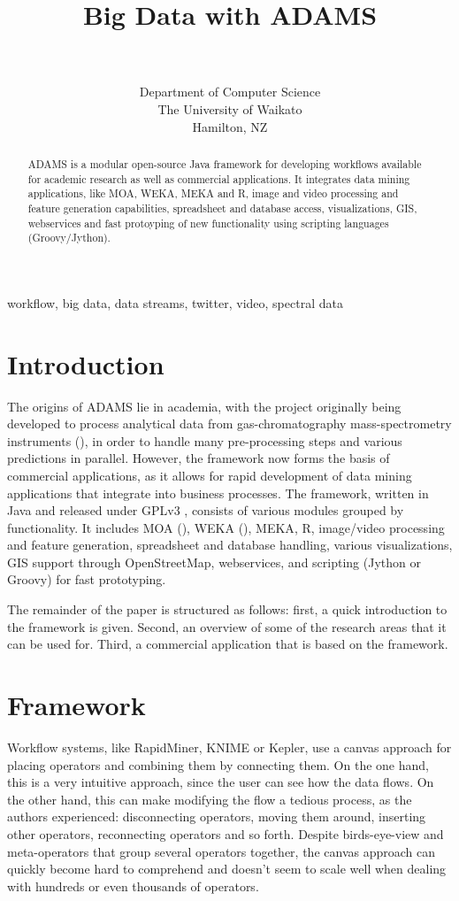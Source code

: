 \documentclass[wcp]{jmlr}
\title[Big Data with ADAMS]{Big Data with ADAMS}
\author{\Name{Peter Reutemann} \Email{fracpete@waikato.ac.nz} \\
  \Name{Geoff Holmes} \Email{geoff@waikato.ac.nz}\\
  \addr Department of Computer Science \\
  The University of Waikato \\
  Hamilton, NZ
 }
\begin{document}
\maketitle

\begin{abstract}
ADAMS is a modular open-source Java framework for developing workflows available for
academic research as well as commercial applications. It integrates
data mining applications, like MOA, WEKA, MEKA and R, image and video
processing and feature generation capabilities, spreadsheet and database
access, visualizations, GIS, webservices and fast protoyping of new 
functionality using scripting languages (Groovy/Jython).
\end{abstract}
\begin{keywords}
workflow, big data, data streams, twitter, video, spectral data
\end{keywords}

\section{Introduction}
The origins of ADAMS lie in academia, with the project originally being developed to process analytical data from gas-chromatography mass-spectrometry instruments (\cite{gcms}), in order to handle many pre-processing steps and various predictions in parallel. However, the framework now forms the basis of commercial applications, as it allows for rapid development of data mining applications that integrate into business processes. The framework, written in Java and released under GPLv3
, consists of various modules grouped by functionality. It includes MOA (\cite{moa}), WEKA (\cite{weka}), MEKA\cite{meka}, R, image/video processing and feature generation, spreadsheet and database handling, various visualizations, GIS support through OpenStreetMap, webservices, and scripting (Jython or Groovy) for fast prototyping.

The remainder of the paper is structured as follows: first, a quick introduction to the framework is given. Second, an overview of some of the research areas that it can be used for. Third, a commercial application that is based on the framework.

\section{Framework}
Workflow systems, like RapidMiner, KNIME or Kepler, use a canvas approach for placing operators and combining them by connecting them. On the one hand, this is a very intuitive approach, since the user can see how the data flows. On the other hand, this can make modifying the flow a tedious process, as the authors experienced: disconnecting operators, moving them around, inserting other operators, reconnecting operators and so forth. Despite birds-eye-view and meta-operators that group several operators together, the canvas approach can quickly become hard to comprehend and doesn't seem to scale well when dealing with hundreds or even thousands of operators.
\end{document}
